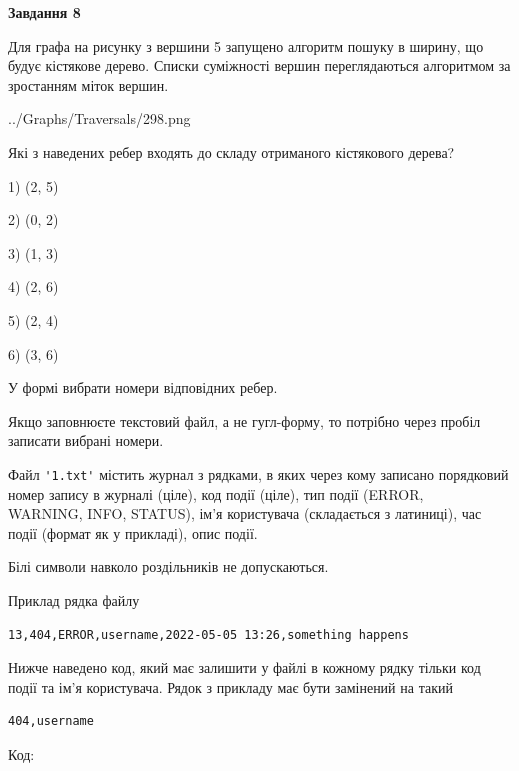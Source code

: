\documentclass[12pt, ukrainian]{article}
\def\code#1{\Verb!#1!}
\begin{document}
{\begin {large}
{\begin {center}\textbf{Завдання 8}\end {center}}\par
Для графа на рисунку з вершини 5 запущено алгоритм пошуку в ширину, що будує кістякове дерево. Списки суміжності вершин переглядаються алгоритмом за зростанням міток вершин.\par
\begin{center}
	{../Graphs/Traversals/298.png}
\end{center}
\par Які з наведених ребер входять до складу отриманого кістякового дерева?\par
1) (2, 5)\par
2) (0, 2)\par
3) (1, 3)\par
4) (2, 6)\par
5) (2, 4)\par
6) (3, 6)\par
{\vskip 15pt} У формі вибрати номери відповідних ребер.


Якщо заповнюєте текстовий файл, а не гугл-форму, то потрібно через пробіл записа\-ти вибрані номери.\par
\newpage


Файл \code{'1.txt'} містить журнал з рядками, в яких через кому записано поряд\-ко\-вий номер запису в журналі (ціле), код події (ціле), тип події (ERROR, \\WARNING, INFO, STATUS), ім'я користувача (складається з латиниці), час події (фор\-мат як у прикладі), опис події.

Білі символи навколо роздільників не допускаються.

Приклад рядка файлу



\begin{verbatim}
13,404,ERROR,username,2022-05-05 13:26,something happens
\end{verbatim}


Нижче наведено код, який має залишити у файлі в кожному рядку тільки код події та ім'я користувача. Рядок з прикладу має бути замінений на такий



\begin{verbatim}
404,username
\end{verbatim}




Код:




\end{large}}
\end{document}
